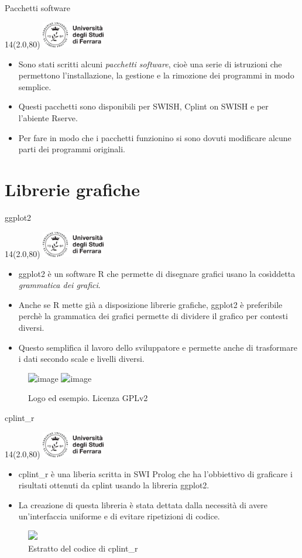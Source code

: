 \documentclass[11pt,xcolor={dvipsnames},default]{beamer} %
\newcommand{\MyLogo}{%
\begin{textblock}{14}(2.0,80)
 \includegraphics[height=1.15cm, angle=0]{logo}
\end{textblock}
}
\begin{document}
\begin{frame}{Pacchetti software}
\transboxin
\MyLogo
\begin{itemize}
\item Sono stati scritti alcuni \emph{pacchetti software}, cioè una serie 
di istruzioni che permettono l'installazione, la gestione e la rimozione dei 
programmi in modo semplice.
\item Questi pacchetti sono disponibili per SWISH, Cplint on SWISH e per 
l'abiente Rserve.
\item Per fare in modo che i pacchetti funzionino si sono dovuti modificare 
alcune parti dei programmi originali.
\end{itemize}
\end{frame}

\section{Librerie grafiche}
\begin{frame}{ggplot2}
\transboxin
\MyLogo
\begin{itemize}
\item ggplot2 è un software R che permette di disegnare grafici usano la 
cosìddetta \emph{grammatica dei grafici}.
\item Anche se R mette già a disposizione librerie grafiche, ggplot2 è 
preferibile perchè la grammatica dei grafici permette di dividere il grafico 
per contesti diversi.
\item Questo semplifica il lavoro dello sviluppatore e permette anche di 
trasformare i dati secondo scale e livelli diversi.
\end{itemize}
\centering
\begin{figure}
\includegraphics<1>[width=.1\textwidth]{ggplot2_logo.png}
\includegraphics<1>[width=.3\textwidth]{ggplot2_example.png}
\caption{Logo ed esempio. Licenza GPLv2}
\end{figure}
\end{frame}

\begin{frame}{cplint\_r}
\transboxin
\MyLogo
\begin{itemize}
\item cplint\_r è una liberia scritta in SWI Prolog che ha l'obbiettivo di 
graficare i risultati ottenuti da cplint usando la libreria ggplot2.
\item La creazione di questa libreria è stata dettata dalla necessità di 
avere un'interfaccia uniforme e di evitare ripetizioni di codice.
\end{itemize}
\centering
\begin{figure}
\includegraphics<1>[width=.3\textwidth]{cplint_r_code_extract.png}
\caption{Estratto del codice di cplint\_r}
\end{figure}
\end{frame}
\end{document}
